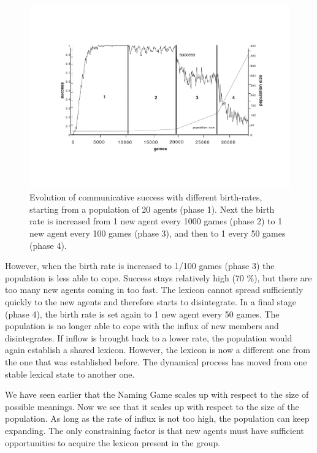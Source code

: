 \begin{figure}[htbp]
  \centerline{\includegraphics[width=\textwidth]{chap5/figs/birth.pdf}}
\caption{\label{birth}Evolution of communicative 
success with different birth-rates, starting from a
population of 20 agents (phase 1). 
Next the birth rate is increased from 1 new agent 
every 1000 games (phase 2) to 
1 new agent every 100 games (phase 3), 
and then to 1 every 50 games (phase 4).}
\end{figure}

However, when the birth rate is increased
to 1/100 games (phase 3) the population is less able to cope. 
Success stays relatively high (70 \%), but there are too many 
new agents coming in too fast. The lexicon cannot spread 
sufficiently quickly to the new agents and therefore starts 
to disintegrate. In a final stage (phase 4), the birth rate 
is set again to 1 new agent every 50 games. The population is no longer  
able to cope with the influx of new members and disintegrates. 
If inflow is brought back to a lower rate, the population would 
again establish a shared lexicon. However, 
the lexicon is now a different one
from the one that was established before. 
The dynamical process
has moved from one stable lexical state to another one.  

We have seen earlier that the Naming Game scales
up with respect to the size of possible meanings. Now 
we see that it scales up with respect to the size of 
the population. As long as the rate of influx is not too
high, the population can keep expanding. 
The only constraining factor is that new agents
must have sufficient opportunities to acquire the lexicon
present in the group. 

